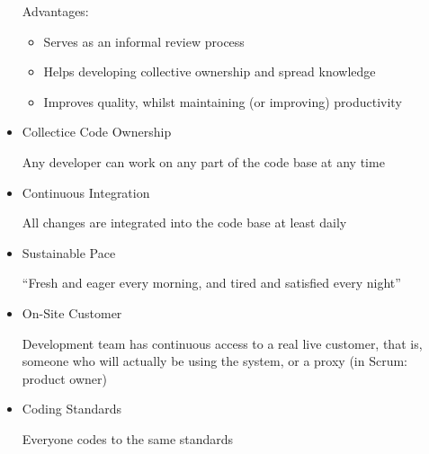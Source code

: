 \documentclass[../ESOF_notes.tex]{subfiles}
\begin{document}
\begin{itemize}
    Advantages:
    \begin{itemize}
        \item Serves as an informal review process
        \item Helps developing collective ownership and spread knowledge
        \item Improves quality, whilst maintaining (or improving) productivity
    \end{itemize}
    \item Collectice Code Ownership
    
    Any developer can work on any part of the code base at any time
    \item Continuous Integration
    
    All changes are integrated into the code base at least daily
    \item Sustainable Pace
    
    “Fresh and eager every morning, and tired and satisfied every night”
    \item On-Site Customer
    
    Development team has continuous access to a real live customer, that is, someone who will actually be
using the system, or a proxy (in Scrum: product owner)
    
    \item Coding Standards
    
    Everyone codes to the same standards
\end{itemize}
\end{document}
